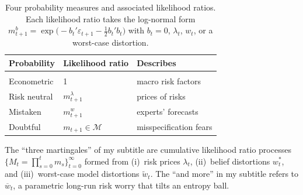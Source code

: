 \documentclass[12pt]{article}
\theoremstyle{definition}
\begin{document}
\begin{table}[H]
\begin{center}
\begin{tabular}{lll}
\textbf{Probability}  & \textbf{Likelihood ratio} & \textbf{Describes} \\
\hline\\[-6pt]
Econometric  &  1 &  macro risk factors \\[4pt]
Risk neutral  & $m_{t+1}^\lambda $ & prices of risks  \\[4pt]
Mistaken &  $m_{t+1}^w $  & experts' forecasts  \\[4pt]
Doubtful & $m_{t+1} \in {\mathcal M} $ & misspecification fears  \\[4pt]
\end{tabular}
\end{center}
\caption{Four probability measures and associated likelihood ratios.
Each likelihood ratio takes the log-normal form
$m_{t+1}^b = \exp\bigl(-b_t' \varepsilon_{t+1} - \tfrac{1}{2} b_t' b_t \bigr)$
with $b_t = 0$, $\lambda_t$, $w_t$, or a worst-case distortion.}
\label{tab:four-measures}
\end{table}

The ``three martingales'' of my subtitle are cumulative likelihood
ratio processes $\{M_t = \prod_{s=0}^t m_s\}_{t=0}^\infty$ formed from (i)~risk prices $\lambda_t$,
(ii)~belief distortions $w_t^*$, and (iii)~worst-case model distortions
$\tilde w_t$.  The ``and more'' in my subtitle refers to $\overline w_t$, a parametric
long-run risk worry that tilts an entropy ball.
\end{document}
